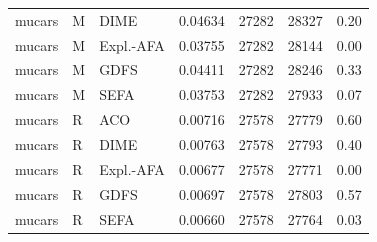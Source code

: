 \begin{longtable}{lllrrrr}
mucars & M & DIME & 0.04634 & 27282 & 28327 & 0.20 \\
mucars & M & Expl.-AFA & 0.03755 & 27282 & 28144 & 0.00 \\
mucars & M & GDFS & 0.04411 & 27282 & 28246 & 0.33 \\
mucars & M & SEFA & 0.03753 & 27282 & 27933 & 0.07 \\
mucars & R & ACO & 0.00716 & 27578 & 27779 & 0.60 \\
mucars & R & DIME & 0.00763 & 27578 & 27793 & 0.40 \\
mucars & R & Expl.-AFA & 0.00677 & 27578 & 27771 & 0.00 \\
mucars & R & GDFS & 0.00697 & 27578 & 27803 & 0.57 \\
mucars & R & SEFA & 0.00660 & 27578 & 27764 & 0.03 \\
\bottomrule\end{longtable}
